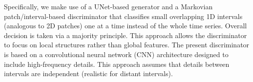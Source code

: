 \documentclass[conference]{IEEEtran}
\begin{document}
Specifically, we make use of a UNet-based generator and a Markovian patch/interval-based discriminator that classifies small overlapping 1D intervals (analogous to 2D patches) one at a time instead of the whole time series. Overall decision is taken via a majority principle. This approach allows the discriminator to focus on local structures rather than global features. The present
discriminator is based on a convolutional neural network (CNN) architecture designed to include high-frequency details. This approach assumes that details between intervals are independent (realistic for distant intervals). 








\end{document}
